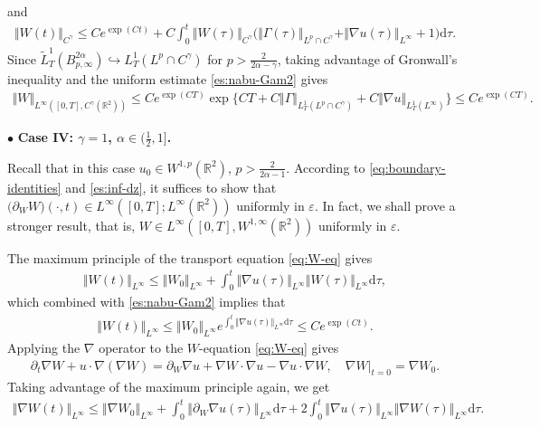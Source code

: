 \documentclass[reqno,11pt,a4paper]{amsart}
\newcommand{\R}{\ensuremath{\mathbb{R}}}
\newcommand{\dd}{\mathrm{d}}
\begin{document}
and
\begin{align*}
  \Vert W(t)\Vert _{C^\gamma}  \leq Ce^{\exp(Ct)} + C \int_0^t \Vert W(\tau)\Vert _{C^\gamma} 
  \big(\Vert \Gamma(\tau)\Vert _{L^p\cap C^\gamma} + \Vert \nabla u(\tau)\Vert _{L^\infty} 
  + 1 \big) \mathrm{d} \tau.
\end{align*}
Since $\widetilde{L}^1_T(B^{2\alpha}_{p,\infty})\hookrightarrow L_T^1(L^p\cap C^\gamma)$ for $p>\frac{2}{2\alpha-\gamma}$, 
taking advantage of Gronwall's inequality and the uniform estimate \eqref{es:nabu-Gam2} gives 
\begin{align}\label{es:W-Cgam}
  \Vert W\Vert _{L^\infty([0,T], C^\gamma(\mathbb{R}^2))}\leq C e^{\exp(CT)} \exp\Big\{C T + C\Vert \Gamma\Vert _{L^1_T(L^p\cap C^\gamma)}
  + C \Vert \nabla u\Vert _{L^1_T(L^\infty)}\Big\} 
  \leq C e^{\exp (CT)}.
\end{align}
\vskip1mm

$\bullet$ \textbf{Case IV: $\gamma=1$, $\alpha\in(\frac{1}{2},1]$.} 
\vskip1mm

Recall that in this case $u_0\in W^{1,p}(\mathbb{R}^2)$, $p>\frac{2}{2\alpha-1}$. 
According to \eqref{eq:boundary-identities} and \eqref{es:inf-dz}, it suffices to show that $\big(\partial_W W\big)(\cdot,t) \in L^\infty([0,T]; L^\infty(\R^2))$
uniformly in $\varepsilon$. 
In fact, we shall prove a stronger result, that is, $W\in L^\infty([0,T], W^{1,\infty}(\R^2))$ uniformly in $\varepsilon$.

The maximum principle of the transport equation \eqref{eq:W-eq} gives
\begin{align}\label{eq:W-Linf-es}
  \Vert W(t)\Vert _{L^\infty} \leq \Vert W_0\Vert _{L^\infty} 
  + \int_0^t \Vert \nabla u(\tau)\Vert _{L^\infty} \Vert W(\tau)\Vert _{L^\infty} \dd \tau,
\end{align}
which combined with \eqref{es:nabu-Gam2} implies that
\begin{align}\label{eq:W-Linf-es-2}
  \Vert W(t)\Vert _{L^\infty} \leq \Vert W_0\Vert _{L^\infty} 
  e^{\int_0^t \Vert \nabla u(\tau)\Vert _{L^\infty}\dd \tau}
  \leq C e^{\exp(Ct)}.
\end{align}
Applying the $\nabla$ operator to the $W$-equation \eqref{eq:W-eq} gives
\begin{align}\label{eq:nabW}
  \partial_t \nabla W+u \cdot \nabla(\nabla W)
  =\partial_W \nabla u+\nabla W \cdot \nabla u-\nabla u \cdot \nabla W,
  \quad \nabla W|_{t=0} = \nabla W_0.
\end{align}
Taking advantage of the maximum principle again, we get
\begin{equation}\label{eq:nabW-Linf}
\begin{aligned}
  \Vert \nabla W(t)\Vert _{L^\infty} \leq  \left\Vert \nabla W_0\right\Vert _{L^\infty}
  + \int_0^t\left\Vert \partial_W \nabla u(\tau) \right\Vert _{L^\infty} \mathrm{d} \tau
  + 2\int_0^t\Vert \nabla u(\tau)\Vert _{L^\infty}\Vert \nabla W(\tau)\Vert _{L^\infty} \mathrm{d} \tau .
\end{aligned}
\end{equation}
\end{document}
